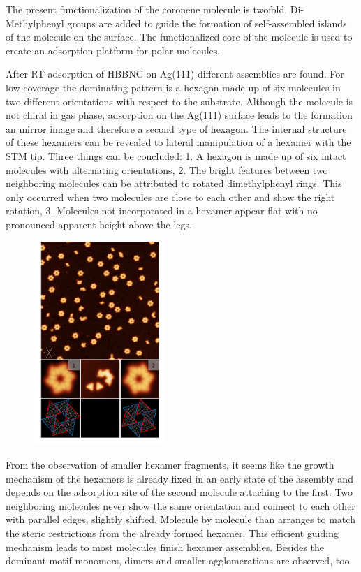 The present functionalization of the coronene molecule is twofold. Di-Methylphenyl groups are added to guide the formation of self-assembled islands of the molecule on the surface. The functionalized core of the molecule is used to create an adsorption platform for polar molecules.

After RT adsorption of HBBNC on Ag(111) different assemblies are found. For low coverage the dominating pattern is a hexagon made up of six molecules in two different orientations with respect to the substrate. Although the molecule is not chiral in gas phase, adsorption on the Ag(111) surface leads to the formation an mirror image and therefore a second type of hexagon. The internal structure of these hexamers can be revealed to lateral manipulation of a hexamer with the STM tip. Three things can be concluded: 1. A hexagon is made up of six intact molecules with alternating orientations, 2. The bright features between two neighboring molecules can be attributed to rotated dimethylphenyl rings. This only occurred when two molecules are close to each other and show the right rotation, 3. Molecules not incorporated in a hexamer appear flat with no pronounced apparent height above the legs.

\begin{figure}\centering
	\includegraphics[width=5cm]{./images/hbbnc-ag-111-rt}
	\caption{}
	\label{}
\end{figure}


From the observation of smaller hexamer fragments, it seems like the growth mechanism of the hexamers is already fixed in an early state of the assembly and depends on the adsorption site of the second molecule attaching to the first. Two neighboring molecules never show the same orientation and connect to each other with parallel edges, slightly shifted.
Molecule by molecule than arranges to match the steric restrictions from the already formed hexamer. This efficient guiding mechanism leads to most molecules finish hexamer assemblies. 
Besides the dominant motif monomers, dimers and smaller agglomerations are observed, too.


